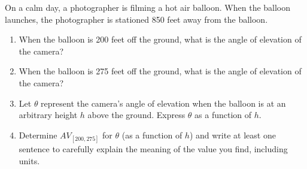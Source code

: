 \documentclass{ximera}
\author{Elizabeth Campolongo}
\begin{document}
\begin{exercise}
On a calm day, a photographer is filming a hot air balloon.  When the balloon launches, the photographer is stationed 850 feet away from the balloon.
%
\begin{enumerate}
\item When the balloon is 200 feet off the ground, what is the angle of elevation of the camera?
%
\item When the balloon is 275 feet off the ground, what is the angle of elevation of the camera?
%
\item Let $\theta$ represent the camera's angle of elevation when the balloon is at an arbitrary height $h$ above the ground.  Express $\theta$ as a function of $h$.
%
\item Determine $AV_{[200,275]}$ for $\theta$ (as a function of $h$) and write at least one sentence to carefully explain the meaning of the value you find, including units.
%
\end{enumerate}
\end{exercise}
\end{document}
